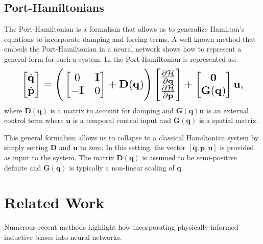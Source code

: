 \documentclass{article}
\begin{document}
\subsection{Port-Hamiltonians}

The Port-Hamiltonian is a formalism that allows us to generalize Hamilton's equations to incorporate damping and forcing terms. A well known method that embeds the Port-Hamiltonian in a neural network \cite{zhong_dissipative_2020} shows how to represent a general form for such a system. In \cite{zhong_dissipative_2020} the Port-Hamiltonian is represented as:
\begin{equation}
\resizebox{0.9\linewidth}{!}{$%
\begin{bmatrix}
\dot{\mathbf{q}} \\
\dot{\mathbf{p}}
\end{bmatrix}
=
\Bigg(\begin{bmatrix}
0 & \mathbf{I} \\
-\mathbf{I} & 0
\end{bmatrix} +
\mathbf{D}(\mathbf{q})
 \Bigg)
 \begin{bmatrix}
\frac{\partial \mathcal{H}}{\partial \mathbf{q}} \\
\frac{\partial \mathcal{H}}{\partial \mathbf{p}}
\end{bmatrix}
+
\begin{bmatrix}
\mathbf{0} \\
\mathbf{G}(\mathbf{q})
\end{bmatrix}
\mathbf{u},
$%
}%
\label{eqn.pham}
\end{equation}
where $\mathbf{D}(\mathbf{q})$ is a matrix to account for damping and $\mathbf{G}(\mathbf{q})\mathbf{u}$ is an external control term where $\mathbf{u}$ is a temporal control input and $\mathbf{G}(\mathbf{q})$ is a spatial matrix. 

This general formalism allows us to collapse to a classical Hamiltonian system by simply setting $\mathbf{D}$ and $\mathbf{u}$ to zero. In this setting, the vector $[\mathbf{q},\mathbf{p},\mathbf{u}]$ is provided as input to the system. The matrix $\mathbf{D}(\mathbf{q})$ is assumed to be semi-positive definite and $\mathbf{G}(\mathbf{q})$ is typically a non-linear scaling of $\mathbf{q}$.

\section{Related Work}

Numerous recent methods highlight how incorporating physically-informed inductive biases into neural networks.
\end{document}
